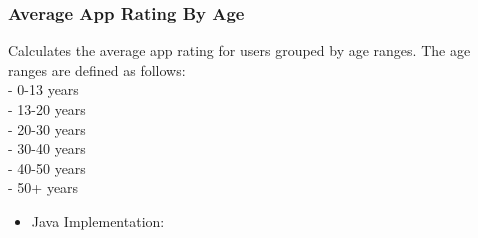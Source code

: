 \newpage

\subsubsection*{Average App Rating By Age}

Calculates the average app rating for users grouped by age ranges.
The age ranges are defined as follows:\\
- 0-13 years\\
- 13-20 years\\
- 20-30 years\\
- 30-40 years\\
- 40-50 years\\
- 50+ years
\begin{itemize}
    \item Java Implementation:
\end{itemize}

